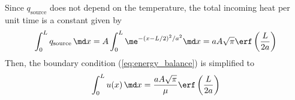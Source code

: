 Since $q_\text{source}$ does not depend on the temperature, the total incoming heat per unit time is a constant given by
\begin{equation}
\int_0^L q_\text{source}\, \md x = A \int_0^L \me^{-(x-L/2)^2/a^2} \md x = a A \sqrt{\pi} \erf\left (\frac{L}{2a} \right )
\end{equation}
Then, the boundary condition (\ref{eq:energy_balance}) is simplified to
\begin{equation}
\int_0^L u(x)\, \md x = \frac{a A \sqrt{\pi}}{\mu} \erf\left (\frac{L}{2a} \right )
\end{equation}
